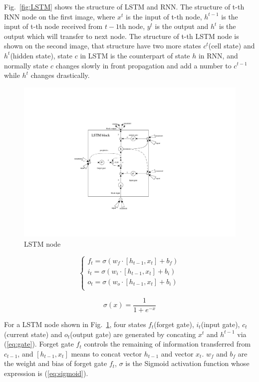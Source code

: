 \documentclass[conference, a4paper]{IEEEtran}
\begin{document}
    Fig.~\ref{fig:LSTM} shows the structure of LSTM and RNN. The structure of t-th RNN node on the first image, where $x^t$ is the input of t-th node, $h^{t-1}$ is the input of t-th node received from $t-1$th node, $y^t$ is the output and $h^t$ is the output which will transfer to next node. The structure of t-th LSTM node is shown on the second image, that structure have two more states $c^t$(cell state) and $h^t$(hidden state), state $c$ in LSTM is the counterpart of state $h$ in RNN, and normally state $c$ changes slowly in front propagation and add a number to $c^{t-1}$ while $h^t$ changes drastically.

    \begin{figure}[htbp]
      \centerline{\includegraphics[width=0.7\linewidth]{figures/LSTM_node.pdf}}
      \caption{LSTM node}
      \label{fig:LSTM2}
    \end{figure}

    \begin{equation}
      \begin{cases}	f_t=\sigma \left( w_f\cdot \left[ h_{t-1},x_t \right] +b_f \right)\\	i_t=\sigma \left( w_i\cdot \left[ h_{t-1},x_t \right] +b_i \right)\\	o_t=\sigma \left( w_o\cdot \left[ h_{t-1},x_t \right] +b_i \right)\\\end{cases}
      \label{eq:gate}
    \end{equation}

    \begin{equation}
      \sigma \left( x \right) =\frac{1}{1+e^{-x}}
      \label{eq:sigmoid}
    \end{equation}

    For a LSTM node shown in Fig.~\ref{fig:LSTM2}, four states $f_t$(forget gate), $i_t$(input gate), $c_t$(current state) and $o_t$(output gate) are generated by concating $x^t$ and $h^{t-1}$ via (\ref{eq:gate}). Forget gate $f_t$ controls the remaining of information transferred from $c_{t-1}$, and $[h_{t-1}, x_t]$ means to concat vector $h_{t-1}$ and vector $x_t$. $w_f$ and $b_f$ are the weight and bias of forget gate $f_t$, $\sigma$ is the Sigmoid activation function whose expression is (\ref{eq:sigmoid}).
\end{document}
